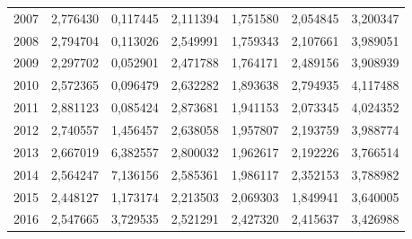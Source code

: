 \begin{table}
\begin{tabular}{p{1cm}p{2cm}p{2cm}p{2cm}p{2cm}p{2cm}p{2cm}}
 2007 &                                    2,776430 &                         0,117445 &                            2,111394 &                                1,751580 &                                     2,054845 &                                3,200347 \\
 2008 &                                    2,794704 &                         0,113026 &                            2,549991 &                                1,759343 &                                     2,107661 &                                3,989051 \\
 2009 &                                    2,297702 &                         0,052901 &                            2,471788 &                                1,764171 &                                     2,489156 &                                3,908939 \\
 2010 &                                    2,572365 &                         0,096479 &                            2,632282 &                                1,893638 &                                     2,794935 &                                4,117488 \\
 2011 &                                    2,881123 &                         0,085424 &                            2,873681 &                                1,941153 &                                     2,073345 &                                4,024352 \\
 2012 &                                    2,740557 &                         1,456457 &                            2,638058 &                                1,957807 &                                     2,193759 &                                3,988774 \\
 2013 &                                    2,667019 &                         6,382557 &                            2,800032 &                                1,962617 &                                     2,192226 &                                3,766514 \\
 2014 &                                    2,564247 &                         7,136156 &                            2,585361 &                                1,986117 &                                     2,352153 &                                3,788982 \\
 2015 &                                    2,448127 &                         1,173174 &                            2,213503 &                                2,069303 &                                     1,849941 &                                3,640005 \\
 2016 &                                    2,547665 &                         3,729535 &                            2,521291 &                                2,427320 &                                     2,415637 &                                3,426988 \\
\bottomrule
\end{tabular}
\end{table}
